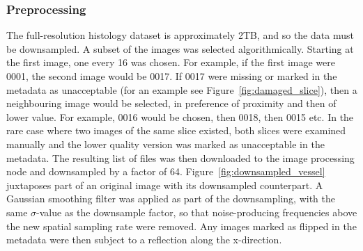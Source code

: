     \subsubsection{Preprocessing} %
    \label{sub:preprocessing}
      The full-resolution histology dataset is approximately 2TB, and so the data must be downsampled. A subset of the images was selected algorithmically. Starting at the first image, one every 16 was chosen. For example, if the first image were 0001, the second image would be 0017. If 0017 were missing or marked in the metadata as unacceptable (for an example see Figure~\ref{fig:damaged_slice}), then a neighbouring image would be selected, in preference of proximity and then of lower value. For example, 0016 would be chosen, then 0018, then 0015 etc. In the rare case where two images of the same slice existed, both slices were examined manually and the lower quality version was marked as unacceptable in the metadata. The resulting list of files was then downloaded to the image processing node and downsampled by a factor of 64. Figure~\ref{fig:downsampled_vessel} juxtaposes part of an original image with its downsampled counterpart. A Gaussian smoothing filter was applied as part of the downsampling, with the same $\sigma$-value as the downsample factor, so that noise-producing frequencies above the new spatial sampling rate were removed. Any images marked as flipped in the metadata were then subject to a reflection along the x-direction.
      
